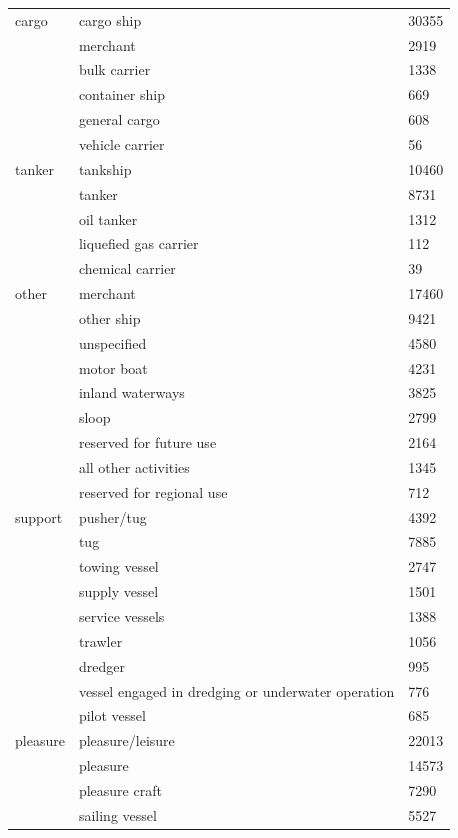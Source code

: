 \begin{longtable}{l|l|l}
\endfoot
    cargo & cargo ship & 30355 \\
          & merchant & 2919 \\
          & bulk carrier & 1338 \\
          & container ship & 669 \\
          & general cargo & 608 \\
          & vehicle carrier & 56 \\
    tanker & tankship & 10460 \\
           & tanker   & 8731 \\
           & oil tanker & 1312 \\
           & liquefied gas carrier & 112 \\
           & chemical carrier & 39 \\
    other & merchant & 17460 \\
          & other ship & 9421 \\
          & unspecified & 4580 \\
          & motor boat & 4231 \\
          & inland waterways & 3825 \\
          & sloop & 2799 \\
          & reserved for future use & 2164 \\
          & all other activities & 1345 \\
          & reserved for regional use & 712 \\
  support & pusher/tug & 4392 \\
          & tug & 7885 \\
          & towing vessel & 2747 \\
          & supply vessel & 1501 \\
          & service vessels & 1388 \\
          & trawler & 1056 \\
          & dredger & 995 \\
          & vessel engaged in dredging or underwater operation & 776 \\
          & pilot vessel & 685 \\
  pleasure & pleasure/leisure & 22013 \\
           & pleasure & 14573 \\
           & pleasure craft & 7290 \\
           & sailing vessel & 5527 \\

\end{longtable}
